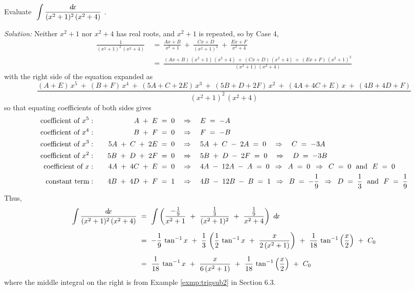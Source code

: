 \begin{exmp}\label{exmp:partfrac5}
\noindent Evaluate $~\displaystyle\int \frac{d\!x}{(x^2+1)^2\,(x^2+4)}~$.\vspace{1mm}
\par\noindent\emph{Solution:} Neither $x^2 + 1$ nor $x^2 + 4$ has real roots,
and $x^2 + 1$ is repeated, so by Case 4,
\begin{align*}
\frac{1}{(x^2+1)^2\,(x^2+4)} ~&=~ \frac{Ax+B}{x^2+1} ~+~ \frac{Cx+D}{(x^2+1)^2} ~+~
 \frac{Ex+F}{x^2+4}\\[4pt]
&=~ \frac{(Ax+B)\,(x^2+1)\,(x^2+4) ~+~ (Cx+D)\,(x^2+4) ~+~ (Ex+F)\,(x^2+1)^2}{(x^2+1)\,(x^2+4)}
\end{align*}
with the right side of the equation expanded as
\[
\frac{(A+E)\,x^5 ~+~ (B+F)\,x^4 ~+~ (5A+C+2E)\,x^3 ~+~ (5B+D+2F)\,x^2 ~+~ (4A+4C+E)\,x
 ~+~ (4B+4D+F)}{(x^2+1)^2\,(x^2+4)}
\]
so that equating coefficients of both sides gives
\begin{alignat*}{3}
\text{coefficient of $x^5$}&: \quad & A \;+\; E \;&=\; 0 \quad\Rightarrow\quad E \;=\; -A\\
\text{coefficient of $x^4$}&: \quad & B \;+\; F \;&=\; 0 \quad\Rightarrow\quad F \;=\; -B\\
\text{coefficient of $x^3$}&: \quad & 5A \;+\; C \;+\; 2E \;&=\; 0
 \quad\Rightarrow\quad 5A \;+\; C \;-\; 2A \;=\; 0 \quad\Rightarrow\quad C \;=\; -3A\\
\text{coefficient of $x^2$}&: \quad & 5B \;+\; D \;+\; 2F \;&=\; 0
 \quad\Rightarrow\quad 5B \;+\; D \;-\; 2F \;=\; 0 \quad\Rightarrow\quad D \;=\; -3B\\
\text{coefficient of $x$}&: \quad & 4A \;+\; 4C \;+\; E \;&=\; 0
 \quad\Rightarrow\quad 4A \;-\; 12A  \;-\; A \;=\; 0
 \enskip\Rightarrow\enskip A \;=\; 0 \enskip\Rightarrow\enskip C \;=\; 0 ~~\text{and}~~ E \;=\; 0\\
\text{constant term}&: \quad & 4B \;+\; 4D \;+\; F \;&=\; 1
 \quad\Rightarrow\quad 4B \;-\; 12B  \;-\; B \;=\; 1
 \enskip\Rightarrow\enskip B \;=\; -\frac{1}{9}
 \enskip\Rightarrow\enskip D \;=\; \frac{1}{3} ~~\text{and}~~ F \;=\; \frac{1}{9}
\end{alignat*}
Thus,
\begin{align*}
\int \frac{d\!x}{(x^2+1)^2\,(x^2+4)} ~&=~ \int \left(\frac{-\frac{1}{9}}{x^2+1} ~+~
 \frac{\frac{1}{3}}{(x^2+1)^2} ~+~ \frac{\frac{1}{9}}{x^2+4}\right)~d\!x\\[6pt]
&=~ -\frac{1}{9}\,\tan^{-1} x ~+~
     \frac{1}{3}\,\left(\frac{1}{2}\,\tan^{-1} x ~+~ \frac{x}{2\,(x^2 + 1)}\right) ~+~
     \frac{1}{18}\,\tan^{-1}\left(\frac{x}{2}\right) ~+~ C_0\\[6pt]
&=~ \frac{1}{18}\,\tan^{-1} x ~+~ \frac{x}{6\,(x^2 + 1)} ~+~
    \frac{1}{18}\,\tan^{-1}\left(\frac{x}{2}\right) ~+~ C_0
\end{align*}
where the middle integral on the right is from Example \ref{exmp:trigsub2} in
Section 6.3.
\end{exmp}
\divider
\vspace{2mm}

